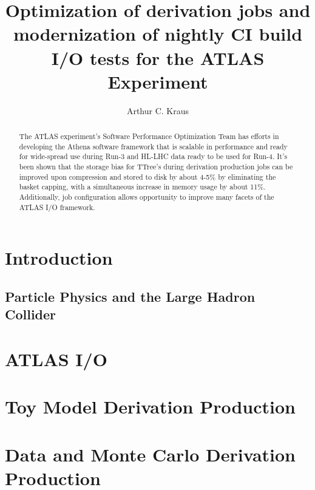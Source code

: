 \documentclass[12pt]{niuthesis}
\title{Optimization of derivation jobs and modernization of nightly CI build I/O tests for the ATLAS Experiment}
\author{Arthur C. Kraus}
\begin{document}
\begin{abstract}
The ATLAS experiment's Software Performance Optimization Team has efforts in developing the Athena software framework that is scalable in performance and ready for wide-spread use during Run-3 and HL-LHC data ready to be used for Run-4. It's been shown that the storage bias for TTree's during derivation production jobs can be improved upon compression and stored to disk by about 4-5\% by eliminating the basket capping, with a simultaneous increase in memory usage by about 11\%. Additionally, job configuration allows opportunity to improve many facets of the ATLAS I/O framework. 
\end{abstract}

\begin{dedication}

\end{dedication}

\begin{acknowledgements}

\end{acknowledgements}
\MakeThesisPrologue




\chapter{Introduction}
\section{Particle Physics and the Large Hadron Collider}


\chapter{ATLAS I/O}


\chapter{Toy Model Derivation Production}


\chapter{Data and Monte Carlo Derivation Production}

\end{document}
